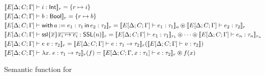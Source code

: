 \begin{figure}
\begin{center}
\end{center}
\begin{align*}
  &\sem{E[\Delta;C;\Gamma] \vdash i : \Int}_r = \{ r \mapsto i \}
  \\
  &\sem{E[\Delta;C;\Gamma] \vdash b : \Bool}_r = \{ r \mapsto b \}
  \\
  &\sem{E[\Delta;C;\Gamma] \vdash \withIn{a := e_1 : \tau_1} e_2 : \tau_2}_r = \sem{E[\Delta;C;\Gamma] \vdash e_1 : \tau_1}_a \osep \sem{E[\Delta;C;\Gamma] \vdash e_2 : \tau_2}_r
  \\
  &\sem{E[\Delta;C;\Gamma] \vdash \ssl{\overline{x}}{\overline{x_i \mapsto e_i}} : \SSL(n)}_r =
    \sem{E[\Delta;C;\Gamma] \vdash e_1 : \tau_1}_{r_1} \osep \cdots \osep \sem{E[\Delta;C;\Gamma] \vdash e_n : \tau_n}_{r_n}
  \\
  &\sem{E[\Delta;C;\Gamma] \vdash e\; v : \tau_2}_r =
      \sem{E[\Delta;C;\Gamma] \vdash e : \tau_1 \ra \tau_2}_r(\sem{E[\Delta;C;\Gamma] \vdash v : \tau_2})
  \\
  &\sem{E[\Delta;C;\Gamma] \vdash \lambda x.\; e : \tau_1 \ra \tau_2}_r(f)
      = \sem{E[\Delta;C;\Gamma, x : \tau_1] \vdash e : \tau_2}_r \osep f(x)
\end{align*}
  \caption{Semantic function for \PikaCore}
\end{figure}

%
%
%
%
